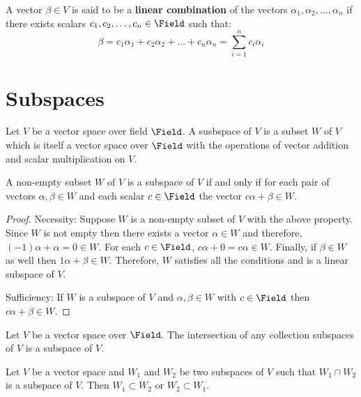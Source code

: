 \begin{definition}
    A vector \(\beta \in V\) is said to be a \textbf{linear combination} of the vectors \(\alpha_1, \alpha_2, \dots, \alpha_n\) if there exists scalars \(c_1, c_2, \dots, c_n \in \Field\) such that:
    \begin{equation*}
        \beta = c_1 \alpha_1 + c_2 \alpha_2 + \dots + c_n \alpha_n = \sum_{i = 1}^{n} c_i \alpha_i
    \end{equation*}
\end{definition}

\section{Subspaces}
Let \(V\) be a vector space over field \(\Field\). A susbspace of \(V\) is a subset \(W\) of \(V\) which is itself a vector space over \(\Field\) with the operations of vector addition and scalar multiplication on \(V\).

\begin{theorem}
    A non-empty subset \(W\) of \(V\) is a subspace of \(V\) if and only if for each pair of vectors \(\alpha, \beta \in W\) and each scalar \(c \in \Field\) the vector \(c\alpha + \beta \in W\).
\end{theorem}

\begin{proof}
    Necessity: Suppose \(W\) is a non-empty subset of \(V\) with the above property. Since \(W\) is not empty then there exists a vector \(\alpha \in W\) and therefore, \((-1) \alpha + \alpha = 0 \in W\). For each \(c \in \Field\), \(c\alpha + 0 = c\alpha \in W\). Finally, if \(\beta \in W\) as well then \(1 \alpha + \beta \in W\). Therefore, \(W\) satisfies all the conditions and is a linear subspace of \(V\).

    Sufficiency: If \(W\) is a subspace of \(V\) and \(\alpha, \beta \in W\) with \(c \in \Field\) then \(c\alpha + \beta \in W\).
\end{proof}

\begin{corollary} \label{th:IntersectionSubspace}
    Let \(V\) be a vector space over \(\Field\). The intersection of any collection subspaces of \(V\) is a subspace of \(V\).
\end{corollary}

\begin{theorem}
    Let \(V\) be a vector space and \(W_1\) and \(W_2\) be two subspaces of \(V\) such that \(W_1 \cap W_2\) is a subspace of \(V\). Then \(W_1 \subset W_2 \) or \(W_2 \subset W_1\).
\end{theorem}

